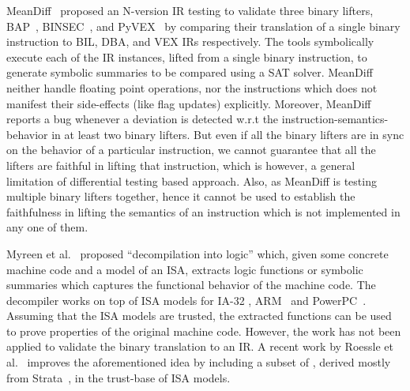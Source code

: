 MeanDiff~\cite{ASE2017} proposed an N-version IR testing to validate three binary
lifters, BAP~\cite{BAP:CAV11}, BINSEC~\cite{BINSEC2011}, and PyVEX~\cite{PYVEX}
by comparing their translation of a single binary instruction to BIL, DBA, and VEX IRs respectively.
The tools symbolically execute each of the IR instances, lifted from a single
binary instruction, to generate symbolic summaries to be compared using a SAT
solver. MeanDiff neither handle floating point operations, nor the instructions
which does not manifest their side-effects (like flag updates) explicitly.
Moreover, MeanDiff reports a bug whenever a deviation is detected w.r.t the
instruction-semantics-behavior in at least two binary lifters. But even if all
the binary lifters are in sync on the behavior of a particular instruction, we
cannot guarantee that all the lifters are faithful in lifting that instruction,
       which is however, a general limitation of differential testing based
       approach. Also, as MeanDiff is testing multiple binary lifters
       together, hence it cannot be used to establish the faithfulness in
       lifting the semantics of an instruction which is not implemented in any one
       of them.

Myreen et al.~\cite{Myreen:FMCAD:2008,Myreen:FMCAD:2012} proposed
``decompilation into logic'' which, given some concrete machine code and a
model of an ISA, extracts logic functions or symbolic summaries which captures
the functional behavior of the machine code. The decompiler works on top of ISA
models for IA-32 \cite{Karl2003}, ARM~\cite{ArmFox2003} and
PowerPC~\cite{Leroy:2006}. Assuming that the ISA models are trusted, the
extracted functions can be used to prove properties of the original machine
code. However, the work has not been applied to validate the binary translation to an IR.
A recent work by Roessle et al.~\cite{Roessle:CPP19} improves the
aforementioned idea  by including a subset of \ISA, derived mostly from
Strata~\cite{Heule2016a}, in the trust-base of ISA models.   






